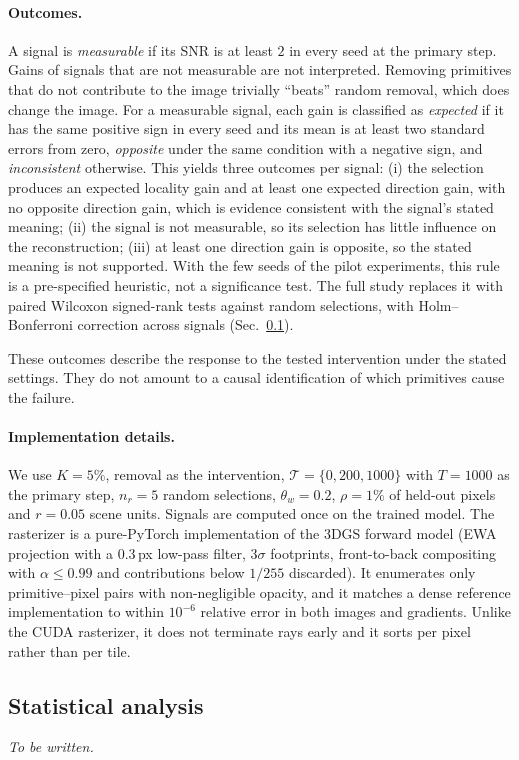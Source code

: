 \paragraph{Outcomes.}
A signal is \emph{measurable} if its SNR is at least $2$ in every seed at the primary step. Gains of
signals that are not measurable are not interpreted. Removing primitives that do not contribute to
the image trivially ``beats'' random removal, which does change the image. For a measurable signal,
each gain is classified as \emph{expected} if it has the same positive sign in every seed and its mean
is at least two standard errors from zero, \emph{opposite} under the same condition with a negative
sign, and \emph{inconsistent} otherwise. This yields three outcomes per signal:
(i) the selection produces an expected locality gain and at least one expected direction gain, with no
opposite direction gain, which is evidence consistent with the signal's stated meaning;
(ii) the signal is not measurable, so its selection has little influence on the reconstruction;
(iii) at least one direction gain is opposite, so the stated meaning is not supported.
With the few seeds of the pilot experiments, this rule is a pre-specified heuristic, not a significance
test. The full study replaces it with paired Wilcoxon signed-rank tests against random selections,
with Holm--Bonferroni correction across signals (Sec.~\ref{sec:stats}).

These outcomes describe the response to the tested intervention under the stated settings. They do not
amount to a causal identification of which primitives cause the failure.

\paragraph{Implementation details.}
We use $K=5\%$, removal as the intervention, $\mathcal{T}=\{0,200,1000\}$ with $T=1000$ as the primary
step, $n_r=5$ random selections, $\theta_w=0.2$, $\rho=1\%$ of held-out pixels and $r=0.05$ scene
units. Signals are computed once on the trained model. The rasterizer is a pure-PyTorch
implementation of the 3DGS forward model (EWA projection with a $0.3$\,px low-pass filter, $3\sigma$
footprints, front-to-back compositing with $\alpha\le0.99$ and contributions below $1/255$ discarded).
It enumerates only primitive--pixel pairs with non-negligible opacity, and it matches a dense reference
implementation to within $10^{-6}$ relative error in both images and gradients. Unlike the CUDA
rasterizer, it does not terminate rays early and it sorts per pixel rather than per tile.

\subsection{Statistical analysis}
\label{sec:stats}
\emph{To be written.}


